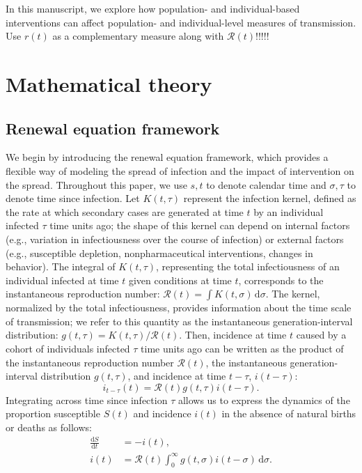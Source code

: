 \documentclass[12pt]{article}
\newcommand{\RR}{\ensuremath{{\mathcal R}}\xspace}
\newcommand{\dd}[1]{\ensuremath{\, \mathrm{d}#1}}
\newcommand{\dsigma}{\dd{\sigma}}
\begin{document}
In this manuscript, we explore how population- and individual-based interventions can affect population- and individual-level measures of transmission.
Use $r(t)$ as a complementary measure along with $\RR(t)$!!!!!

\section{Mathematical theory}

\subsection{Renewal equation framework}

We begin by introducing the renewal equation framework, which provides a flexible way of modeling the spread of infection and the impact of intervention on the spread.
Throughout this paper, we use $s, t$ to denote calendar time and $\sigma, \tau$ to denote time since infection.
Let $K(t, \tau)$ represent the infection kernel, defined as the rate at which secondary cases are generated at time $t$ by an individual infected $\tau$ time units ago;
the shape of this kernel can depend on internal factors (e.g., variation in infectiousness over the course of infection) or external factors (e.g., susceptible depletion, nonpharmaceutical interventions, changes in behavior).
The integral of $K(t, \tau)$, representing the total infectiousness of an individual infected at time $t$ given conditions at time $t$, corresponds to the instantaneous reproduction number: $\RR(t) = \int K(t, \sigma) \dsigma$.
The kernel, normalized by the total infectiousness, provides information about the time scale of transmission; we refer to this quantity as the instantaneous generation-interval distribution: $g(t, \tau) = K(t, \tau)/\RR(t)$.
Then, incidence at time $t$ caused by a cohort of individuals infected $\tau$ time units ago can be written as the product of the instantaneous reproduction number $\RR(t)$, the instantaneous generation-interval distribution $g(t, \tau)$, and incidence at time $t-\tau$, $i(t-\tau)$:
\begin{equation}
i_{t-\tau}(t) = \RR(t) g(t, \tau) i(t-\tau).
\end{equation}
Integrating across time since infection $\tau$ allows us to express the dynamics of the proportion susceptible $S(t)$ and incidence $i(t)$ in the absence of natural births or deaths as follows: 
\begin{align}
\frac{\mathrm{d}S}{\mathrm{d}t} &= - i(t),\\
i(t) &= \RR(t) \int_0^\infty  g(t, \sigma) i(t-\sigma) \dsigma.
\label{eq:renewal}
\end{align}
\end{document}
